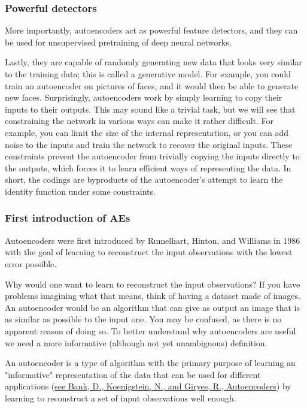 \documentclass{beamer}
\begin{document}
\begin{frame}
\frametitle{Powerful detectors}

More importantly, autoencoders act as powerful feature detectors, and
they can be used for unsupervised pretraining of deep neural networks.

Lastly, they are capable of randomly generating new data that looks
very similar to the training data; this is called a generative
model. For example, you could train an autoencoder on pictures of
faces, and it would then be able to generate new faces.  Surprisingly,
autoencoders work by simply learning to copy their inputs to their
outputs. This may sound like a trivial task, but we will see that
constraining the network in various ways can make it rather
difficult. For example, you can limit the size of the internal
representation, or you can add noise to the inputs and train the
network to recover the original inputs. These constraints prevent the
autoencoder from trivially copying the inputs directly to the outputs,
which forces it to learn efficient ways of representing the data. In
short, the codings are byproducts of the autoencoder’s attempt to
learn the identity function under some constraints.
\end{frame}

\begin{frame}
\frametitle{First introduction of AEs}

Autoencoders were first introduced by Rumelhart, Hinton, and Williams
in 1986 with the goal of learning to reconstruct the input
observations with the lowest error possible.

Why would one want to learn to reconstruct the input observations? If
you have problems imagining what that means, think of having a dataset
made of images. An autoencoder would be an algorithm that can give as
output an image that is as similar as possible to the input one. You
may be confused, as there is no apparent reason of doing so. To better
understand why autoencoders are useful we need a more informative
(although not yet unambiguous) definition.

\begin{block}{}
An autoencoder is a type of algorithm with the primary purpose of learning an "informative" representation of the data that can be used for different applications (\href{{https://arxiv.org/abs/2003.05991}}{see Bank, D., Koenigstein, N., and Giryes, R., Autoencoders}) by learning to reconstruct a set of input observations well enough.
\end{block}
\end{frame}
\end{document}
